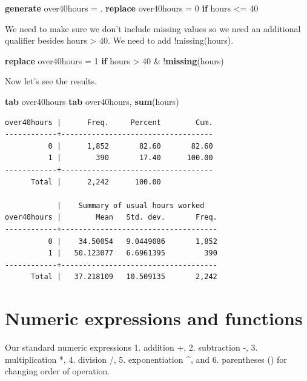\documentclass[
]{book}
\newenvironment{Shaded}{\begin{snugshade}}{\end{snugshade}}
\newcommand{\FunctionTok}[1]{\textcolor[rgb]{0.13,0.29,0.53}{\textbf{#1}}}
\newcommand{\KeywordTok}[1]{\textcolor[rgb]{0.13,0.29,0.53}{\textbf{#1}}}
\newcommand{\NormalTok}[1]{#1}
\begin{document}
\begin{Shaded}
\begin{Highlighting}[]
\KeywordTok{generate}\NormalTok{ over40hours = .}
\KeywordTok{replace}\NormalTok{ over40hours = 0 }\KeywordTok{if}\NormalTok{ hours \textless{}= 40}
\end{Highlighting}
\end{Shaded}

We need to make sure we don't include missing values so we need an additional qualifier besides hours \textgreater{} 40. We need to add !missing(hours).

\begin{Shaded}
\begin{Highlighting}[]
\KeywordTok{replace}\NormalTok{ over40hours = 1 }\KeywordTok{if}\NormalTok{ hours \textgreater{} 40 \& !}\FunctionTok{missing}\NormalTok{(hours)}
\end{Highlighting}
\end{Shaded}

Now let's see the results.

\begin{Shaded}
\begin{Highlighting}[]
\KeywordTok{tab}\NormalTok{ over40hours}
\KeywordTok{tab}\NormalTok{ over40hours, }\KeywordTok{sum}\NormalTok{(hours)}
\end{Highlighting}
\end{Shaded}

\begin{verbatim}
over40hours |      Freq.     Percent        Cum.
------------+-----------------------------------
          0 |      1,852       82.60       82.60
          1 |        390       17.40      100.00
------------+-----------------------------------
      Total |      2,242      100.00

            |    Summary of usual hours worked
over40hours |        Mean   Std. dev.       Freq.
------------+------------------------------------
          0 |    34.50054   9.0449086       1,852
          1 |   50.123077   6.6961395         390
------------+------------------------------------
      Total |   37.218109   10.509135       2,242
\end{verbatim}

\section{Numeric expressions and functions}\label{numeric-expressions-and-functions}

Our standard numeric expressions
1. addition +,
2. subtraction -,
3. multiplication *,
4. division /,
5. exponentiation \^{}, and
6. parentheses () for changing order of operation.
\end{document}
